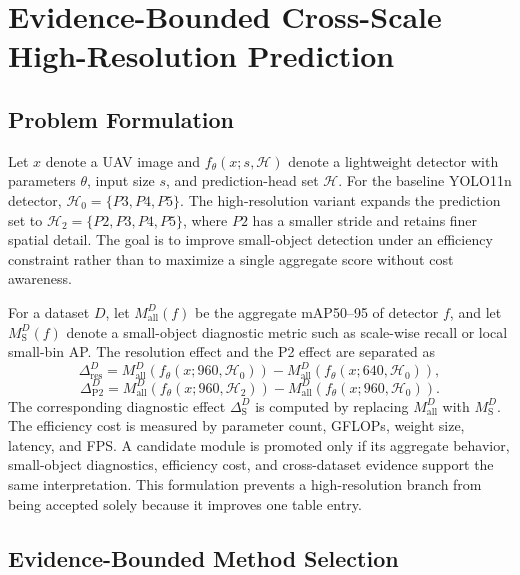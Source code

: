 \documentclass[journal]{IEEEtran}
\begin{document}


\section{Evidence-Bounded Cross-Scale High-Resolution Prediction}

\subsection{Problem Formulation}

Let \(x\) denote a UAV image and \(f_{\theta}(x;s,\mathcal{H})\) denote a lightweight detector with parameters \(\theta\), input size \(s\), and prediction-head set \(\mathcal{H}\). For the baseline YOLO11n detector, \(\mathcal{H}_{0}=\{P3,P4,P5\}\). The high-resolution variant expands the prediction set to \(\mathcal{H}_{2}=\{P2,P3,P4,P5\}\), where \(P2\) has a smaller stride and retains finer spatial detail. The goal is to improve small-object detection under an efficiency constraint rather than to maximize a single aggregate score without cost awareness.

For a dataset \(D\), let \(M_{\mathrm{all}}^{D}(f)\) be the aggregate mAP50--95 of detector \(f\), and let \(M_{\mathrm{S}}^{D}(f)\) denote a small-object diagnostic metric such as scale-wise recall or local small-bin AP. The resolution effect and the P2 effect are separated as
\begin{equation}
\Delta_{\mathrm{res}}^{D}=M_{\mathrm{all}}^{D}(f_{\theta}(x;960,\mathcal{H}_{0}))-
M_{\mathrm{all}}^{D}(f_{\theta}(x;640,\mathcal{H}_{0})),
\end{equation}
\begin{equation}
\Delta_{\mathrm{P2}}^{D}=M_{\mathrm{all}}^{D}(f_{\theta}(x;960,\mathcal{H}_{2}))-
M_{\mathrm{all}}^{D}(f_{\theta}(x;960,\mathcal{H}_{0})).
\end{equation}
The corresponding diagnostic effect \(\Delta_{\mathrm{S}}^{D}\) is computed by replacing \(M_{\mathrm{all}}^{D}\) with \(M_{\mathrm{S}}^{D}\). The efficiency cost is measured by parameter count, GFLOPs, weight size, latency, and FPS. A candidate module is promoted only if its aggregate behavior, small-object diagnostics, efficiency cost, and cross-dataset evidence support the same interpretation. This formulation prevents a high-resolution branch from being accepted solely because it improves one table entry.

\subsection{Evidence-Bounded Method Selection}
\end{document}
